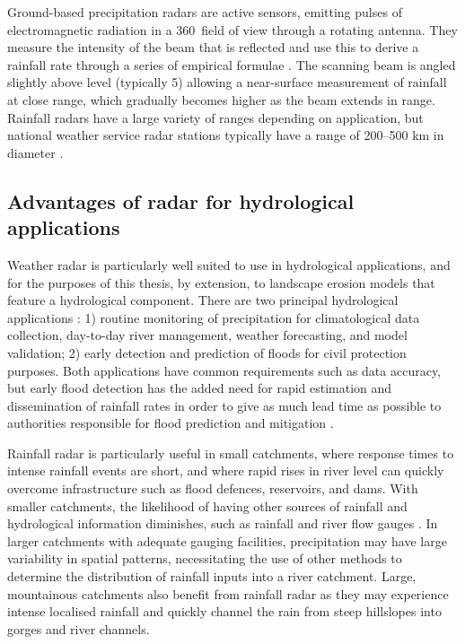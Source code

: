Ground-based precipitation radars are active sensors, emitting pulses of electromagnetic radiation in a 360\degree \ field of view through a rotating antenna. They measure the intensity of the beam that is reflected and use this to derive a rainfall rate through a series of empirical formulae \citep{wilson1979radar}. The scanning beam is angled slightly above level (typically 5\degree) allowing a near-surface measurement of rainfall at close range, which gradually becomes higher as the beam extends in range.  Rainfall radars have a large variety of ranges depending on application, but national weather service radar stations typically have a range of 200--500 km in diameter \citep{fabry2015radar}.  

\subsection{Advantages of radar for hydrological applications}
Weather radar is particularly well suited to use in hydrological applications, and for the purposes of this thesis, by extension, to landscape erosion models that feature a hydrological component. There are two principal hydrological applications \citep{harrison2012radar}: 1) routine monitoring of precipitation for climatological data collection, day-to-day river management, weather forecasting, and model validation; 2) early detection and prediction of floods for civil protection purposes. Both applications have common requirements such as data accuracy, but early flood detection has the added need for rapid estimation and dissemination of rainfall rates in order to give as much lead time as possible to authorities responsible for flood prediction and mitigation \citep{fabry2015radar}. 

Rainfall radar is particularly useful in small catchments, where response times to intense rainfall events are short, and where rapid rises in river level can quickly overcome infrastructure such as flood defences, reservoirs, and dams. With smaller catchments, the likelihood of having other sources of rainfall and hydrological information diminishes, such as rainfall and river flow gauges \citep{fabry2015radar}. In larger catchments with adequate gauging facilities, precipitation may have large variability in spatial patterns, necessitating the use of other methods to determine the distribution of rainfall inputs into a river catchment. Large, mountainous catchments also benefit from rainfall radar as they may experience intense localised rainfall and quickly channel the rain from steep hillslopes into gorges and river channels.



